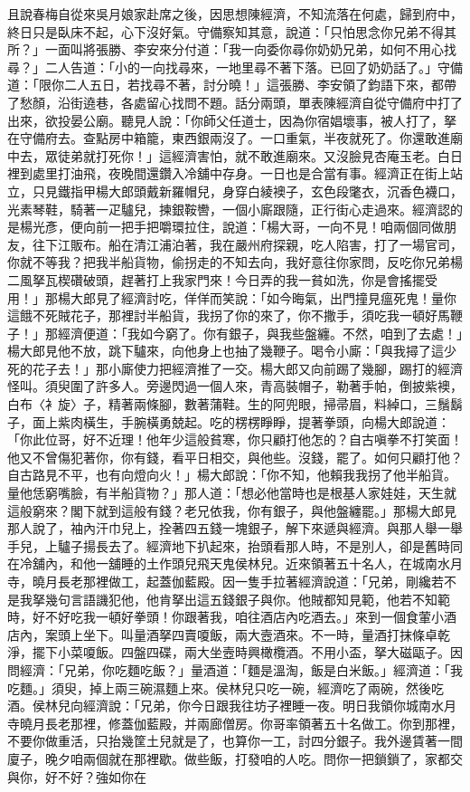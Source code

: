 且說春梅自從來吳月娘家赴席之後，因思想陳經濟，不知流落在何處，歸到府中，終日只是臥床不起，心下沒好氣。守備察知其意，說道：「只怕思念你兄弟不得其所？」一面叫將張勝、李安來分付道：「我一向委你尋你奶奶兄弟，如何不用心找尋？」二人告道：「小的一向找尋來，一地里尋不著下落。已回了奶奶話了。」守備道：「限你二人五日，若找尋不著，討分曉！」這張勝、李安領了鈞語下來，都帶了愁顏，沿街遶巷，各處留心找問不題。話分兩頭，單表陳經濟自從守備府中打了出來，欲投晏公廟。聽見人說：「你師父任道士，因為你宿娼壞事，被人打了，拏在守備府去。查點房中箱籠，東西銀兩沒了。一口重氣，半夜就死了。你還敢進廟中去，眾徒弟就打死你！」這經濟害怕，就不敢進廟來。又沒臉見杏庵玉老。白日裡到處里打油飛，夜晚間還鑽入冷舖中存身。一日也是合當有事。經濟正在街上站立，只見鐵指甲楊大郎頭戴新羅帽兒，身穿白綾襖子，玄色段氅衣，沉香色襪口，光素琴鞋，騎著一疋驢兒，揀銀鞍轡，一個小廝跟隨，正行街心走過來。經濟認的是楊光彥，便向前一把手把嚼環拉住，說道：「楊大哥，一向不見！咱兩個同做朋友，往下江販布。船在清江浦泊著，我在嚴州府探親，吃人陷害，打了一場官司，你就不等我？把我半船貨物，偷拐走的不知去向，我好意往你家問，反吃你兄弟楊二風拏瓦楔礸破頭，趕著打上我家門來！今日弄的我一貧如洗，你是會搖擺受用！」那楊大郎見了經濟討吃，佯佯而笑說：「如今晦氣，出門撞見瘟死鬼！量你這餓不死賊花子，那裡討半船貨，我拐了你的來了，你不撒手，須吃我一頓好馬鞭子！」那經濟便道：「我如今窮了。你有銀子，與我些盤纏。不然，咱到了去處！」楊大郎見他不放，跳下驢來，向他身上也抽了幾鞭子。喝令小廝：「與我撏了這少死的花子去！」那小廝使力把經濟推了一交。楊大郎又向前踢了幾腳，踢打的經濟怪叫。須臾圍了許多人。旁邊閃過一個人來，青高裝帽子，勒著手帕，倒披紫襖，白布〈衤旋〉子，精著兩條腳，數著蒲鞋。生的阿兜眼，掃帚眉，料綽口，三鬚鬍子，面上紫肉橫生，手腕橫勇兢起。吃的楞楞睜睜，提著拳頭，向楊大郎說道：「你此位哥，好不近理！他年少這般貧寒，你只顧打他怎的？自古嗔拳不打笑面！他又不曾傷犯著你，你有錢，看平日相交，與他些。沒錢，罷了。如何只顧打他？自古路見不平，也有向燈向火！」楊大郎說：「你不知，他賴我我拐了他半船貨。量他恁窮嘴臉，有半船貨物？」那人道：「想必他當時也是根基人家娃娃，天生就這般窮來？閣下就到這般有錢？老兄依我，你有銀子，與他盤纏罷。」那楊大郎見那人說了，袖內汗巾兒上，拴著四五錢一塊銀子，解下來遞與經濟。與那人舉一舉手兒，上驢子揚長去了。經濟地下扒起來，抬頭看那人時，不是別人，卻是舊時同在冷舖內，和他一舖睡的土作頭兒飛天鬼侯林兒。近來領著五十名人，在城南水月寺，曉月長老那裡做工，起蓋伽藍殿。因一隻手拉著經濟說道：「兄弟，剛纔若不是我拏幾句言語譏犯他，他肯拏出這五錢銀子與你。他賊都知見範，他若不知範時，好不好吃我一頓好拳頭！你跟著我，咱往酒店內吃酒去。」來到一個食葷小酒店內，案頭上坐下。叫量酒拏四賣嗄飯，兩大壼酒來。不一時，量酒打抹條卓乾淨，擺下小菜嗄飯。四盤四碟，兩大坐壼時興橄欖酒。不用小盃，拏大磁甌子。因問經濟：「兄弟，你吃麵吃飯？」量酒道：「麵是溫淘，飯是白米飯。」經濟道：「我吃麵。」須臾，掉上兩三碗濕麵上來。侯林兒只吃一碗，經濟吃了兩碗，然後吃酒。侯林兒向經濟說：「兄弟，你今日跟我往坊子裡睡一夜。明日我領你城南水月寺曉月長老那裡，修蓋伽藍殿，并兩廊僧房。你哥率領著五十名做工。你到那裡，不要你做重活，只抬幾筐土兒就是了，也算你一工，討四分銀子。我外邊賃著一間廈子，晚夕咱兩個就在那裡歇。做些飯，打發咱的人吃。問你一把鎖鎖了，家都交與你，好不好？強如你在